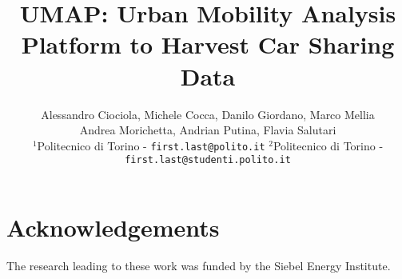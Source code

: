 \documentclass[10pt, conference]{IEEEtran}
\title{UMAP: Urban Mobility Analysis Platform to Harvest Car Sharing Data}
\author{
Alessandro Ciociola\inst{2},   
Michele Cocca\inst{2},   
Danilo Giordano\inst{1},  
Marco Mellia\inst{1}\\
Andrea Morichetta\inst{1},  
Andrian Putina\inst{2},    
Flavia Salutari\inst{2}
\vspace{0.1cm}
\\
\small
$^1$Politecnico di Torino - \texttt{first.last@polito.it} 
$^2$Politecnico di Torino - \texttt{first.last@studenti.polito.it}  \\
}
\begin{document}
\maketitle
\begin{abstract} 

\end{abstract}









\section{Acknowledgements}
The research leading to these work was funded by the Siebel Energy Institute. %



\end{document}
